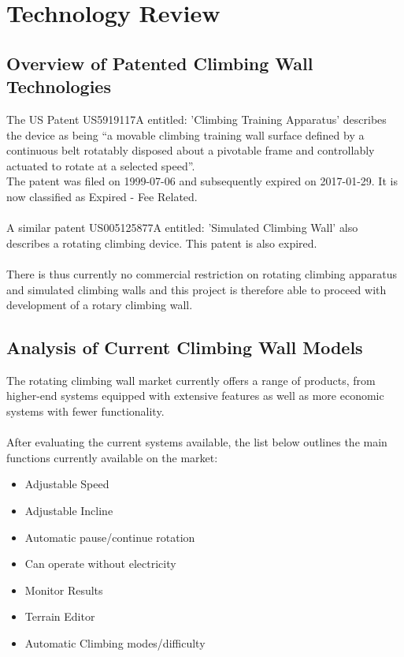 \chapter{Technology Review}
\label{chap:technology_review}

\section{Overview of Patented Climbing Wall Technologies}

The US Patent US5919117A entitled: 'Climbing Training Apparatus' \cite{US5919117A} describes the device as being “a movable climbing training wall surface defined by a continuous belt rotatably disposed about a pivotable frame and controllably actuated to rotate at a selected speed”.\\
The patent was filed on 1999-07-06 and subsequently expired on 2017-01-29. It is now classified as Expired - Fee Related.\\\\
A similar patent US005125877A entitled: 'Simulated Climbing Wall' \cite{US5125877A} also describes a rotating climbing device. This patent is also expired.\\\\
There is thus currently no commercial restriction on rotating climbing apparatus and simulated climbing walls and this project is therefore able to proceed with development of a rotary climbing wall.

\section{Analysis of Current Climbing Wall Models}
The rotating climbing wall market currently offers a range of products, from higher-end systems equipped with extensive features as well as more economic systems with fewer functionality. \\\\
After evaluating the current systems available, the list below outlines the main functions currently available on the market:

\begin{itemize}
    \item Adjustable Speed
    \item Adjustable Incline
    \item Automatic pause/continue rotation
    \item Can operate without electricity
    \item Monitor Results
    \item  Terrain Editor
    \item Automatic Climbing modes/difficulty
\end{itemize}


